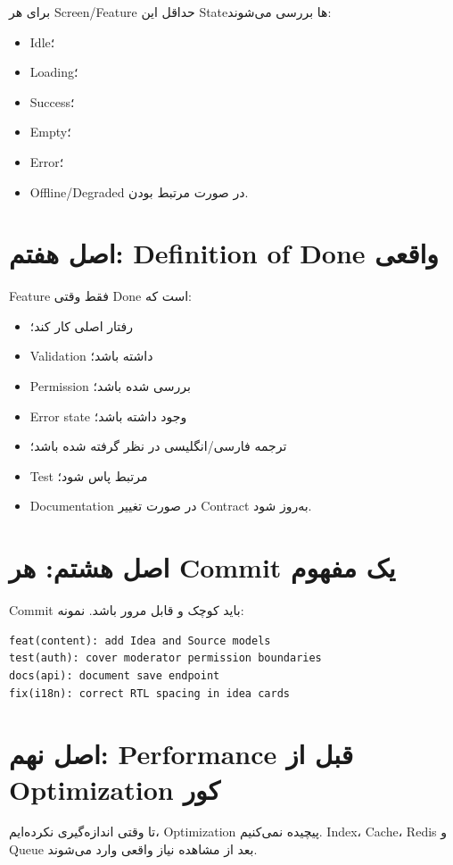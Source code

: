 برای هر Screen/Feature حداقل این Stateها بررسی می‌شوند:
\begin{itemize}
  \item Idle؛
  \item Loading؛
  \item Success؛
  \item Empty؛
  \item Error؛
  \item Offline/Degraded در صورت مرتبط بودن.
\end{itemize}

\section{اصل هفتم: Definition of Done واقعی}

Feature فقط وقتی Done است که:
\begin{itemize}
  \item رفتار اصلی کار کند؛
  \item Validation داشته باشد؛
  \item Permission بررسی شده باشد؛
  \item Error state وجود داشته باشد؛
  \item ترجمه فارسی/انگلیسی در نظر گرفته شده باشد؛
  \item Test مرتبط پاس شود؛
  \item Documentation در صورت تغییر Contract به‌روز شود.
\end{itemize}

\section{اصل هشتم: هر Commit یک مفهوم}

Commit باید کوچک و قابل مرور باشد. نمونه:
\begin{latin}
\begin{lstlisting}
feat(content): add Idea and Source models
test(auth): cover moderator permission boundaries
docs(api): document save endpoint
fix(i18n): correct RTL spacing in idea cards
\end{lstlisting}
\end{latin}

\section{اصل نهم: Performance قبل از Optimization کور}

تا وقتی اندازه‌گیری نکرده‌ایم، Optimization پیچیده نمی‌کنیم. Index، Cache، Redis و Queue بعد از مشاهده نیاز واقعی وارد می‌شوند.

